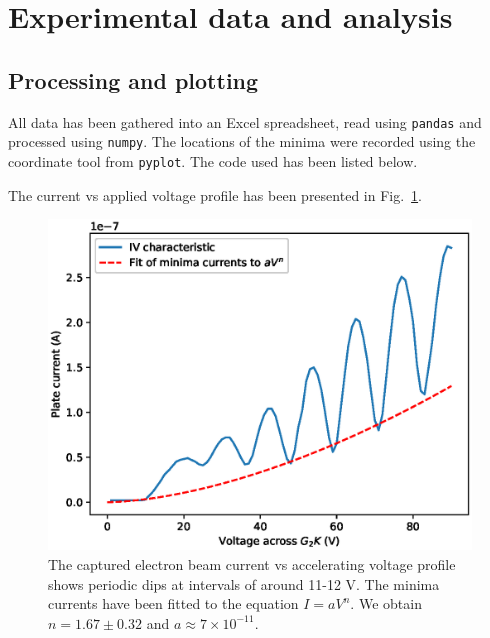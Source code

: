 \documentclass[11pt]{article}
\begin{document}
        
        \section{Experimental data and analysis}
        
        \subsection{Processing and plotting}
        
        All data has been gathered into an Excel spreadsheet, read using \texttt{pandas} and processed using \texttt{numpy}.
        The locations of the minima were recorded using the coordinate tool from \texttt{pyplot}.
        The code used has been listed below.

        

        The current vs applied voltage profile has been presented in Fig.~\ref{fig:VI}.
        \begin{figure}[h]
                \centering
                \includegraphics[width=\textwidth]{./VI.eps}
                \caption{The captured electron beam current vs accelerating voltage profile shows periodic dips at intervals of around 11-12 V.
                The minima currents have been fitted to the equation $I = aV^n$. We obtain $n = 1.67 \pm 0.32$ and $a \approx 7\times 10^{-11}$.}
                \label{fig:VI}
        \end{figure}
\end{document}
